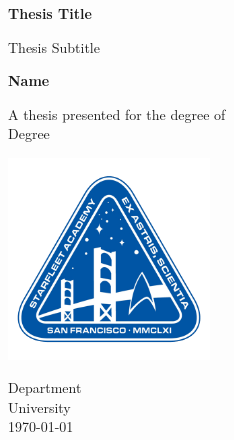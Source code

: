 \documentclass[class=book, crop=false]{standalone}
\begin{document}
    \begin{titlepage}
        \begin{center}
            \sffamily

            \vspace*{1cm}
    
            \textbf{\LARGE{Thesis Title}}
    
            \vspace{0.5cm}
            Thesis Subtitle
                
            \vspace{1.5cm}
    
            \textbf{\Large{Name}}
    
            \vfill
                
            A thesis presented for the degree of
            \\
            Degree
                
            \vspace{0.8cm}
        

            \includegraphics[width=0.4\textwidth]{StarfleetAcademyLogo.png}
            
            Department
            \\
            University
            \\
            \today
        \end{center}
    \end{titlepage}
\end{document}

